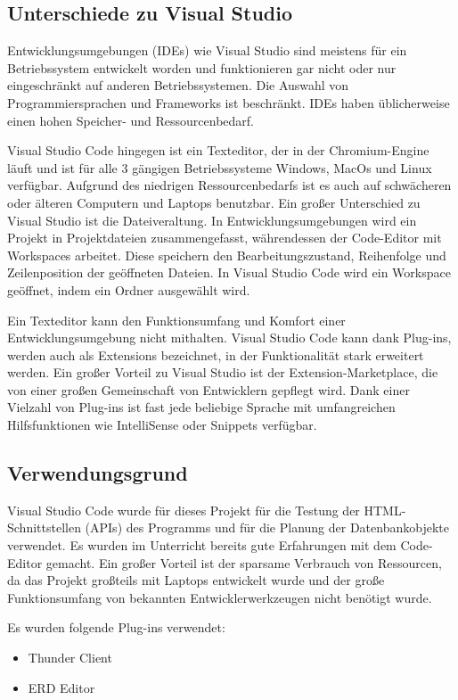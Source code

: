 \subsection{Unterschiede zu Visual Studio}
Entwicklungsumgebungen (IDEs) wie Visual Studio sind meistens für ein Betriebssystem entwickelt worden und funktionieren 
gar nicht oder nur eingeschränkt auf anderen Betriebssystemen. Die Auswahl von Programmiersprachen und Frameworks ist beschränkt. IDEs 
haben üblicherweise einen hohen Speicher- und Ressourcenbedarf.

Visual Studio Code hingegen ist ein Texteditor, der in der Chromium-Engine läuft und ist für alle 3 gängigen Betriebssysteme 
Windows, MacOs und Linux verfügbar. Aufgrund des niedrigen Ressourcenbedarfs ist es auch auf schwächeren oder älteren Computern und Laptops benutzbar.
Ein großer Unterschied zu Visual Studio ist die Dateiveraltung. 
In Entwicklungsumgebungen wird ein Projekt in Projektdateien zusammengefasst, 
währendessen der Code-Editor mit Workspaces arbeitet. Diese speichern den 
Bearbeitungszustand, Reihenfolge und Zeilenposition der geöffneten Dateien. 
In Visual Studio Code wird ein Workspace geöffnet, indem ein Ordner ausgewählt wird.

Ein Texteditor kann den Funktionsumfang und Komfort einer Entwicklungsumgebung nicht mithalten. Visual Studio Code 
kann dank Plug-ins, werden auch als Extensions bezeichnet, in der Funktionalität stark erweitert werden.
Ein großer Vorteil zu Visual Studio ist der Extension-Marketplace, die von einer großen Gemeinschaft von Entwicklern gepflegt wird.
Dank einer Vielzahl von Plug-ins ist fast jede beliebige Sprache mit umfangreichen Hilfsfunktionen wie IntelliSense oder Snippets verfügbar.

\subsection{Verwendungsgrund}
Visual Studio Code wurde für dieses Projekt für die Testung der HTML-Schnittstellen (APIs) des Programms und für die Planung der Datenbankobjekte verwendet.
Es wurden im Unterricht bereits gute Erfahrungen mit dem Code-Editor gemacht. Ein großer Vorteil ist der sparsame Verbrauch von Ressourcen, 
da das Projekt großteils mit Laptops entwickelt wurde und der große Funktionsumfang von bekannten Entwicklerwerkzeugen nicht benötigt wurde.

Es wurden folgende Plug-ins verwendet:
\begin{itemize}
    \item Thunder Client
    \item ERD Editor
\end{itemize}

